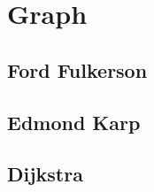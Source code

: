 \documentclass[10pt,landscape,a4paper,twocolumn]{article}
\begin{document}
\begin{comment}
ì¡°ê±Ž 2-1) ë¹ì©$C$ê° ë€ìì ì¬ê°ë¶ë±ìì ë§ì¡±íë ê²œì°ë ì¡°ê±Ž 2)ë¥Œ ë§ì¡±íê² ëš

$C[a][c] + C[b][d] \leq C[a][d] + C[b][c] \phantom{1} (a \leq b \leq c \leq d)$

\subsection{Knuth Optimization}

$O(n^{3}) \to O(n^{2})$

ì¡°ê±Ž 1) DP ì íì êŒŽ

$D[i][j] = \min_{i<k<j}( D[i][k] + D[k][j] ) + C[i][j]$

ì¡°ê±Ž 2) ì¬ê° ë¶ë±ì

$C[a][c] + C[b][d] \leq C[a][d] + C[b][c] \phantom{1} (a \leq b \leq c \leq d)$

ì¡°ê±Ž 3) ëšì¡°ì±

$C[b][c] \leq C[a][d] \phantom{1} (a \leq b \leq c \leq d)$

ê²°ë¡ ) ì¡°ê±Ž 2, 3ì ë§ì¡±íë€ë©Ž  $A[i][j]$ë¥Œ $D[i][j]$ì ëµìŽ ëë ìµìì $k$ëŒ í  ë, ìëì ë¶ë±ìì ë§ì¡±íê² ëš

$A[i][j-1] \leq A[i][j] \leq A[i+1][j]$

3ì€ ë£šíë¥Œ ëëŠŽ ë ì ì¡°ê±Žì ìŽì©íë©Ž ìµì¢ì ìŒë¡ ìê°ë³µì¡ëê° $O(n^{2})$ ìŽ ëš
\end{comment}

\section{Graph}

\subsection{Ford Fulkerson}


\subsection{Edmond Karp}


\subsection{Dijkstra}



%
\end{document}

